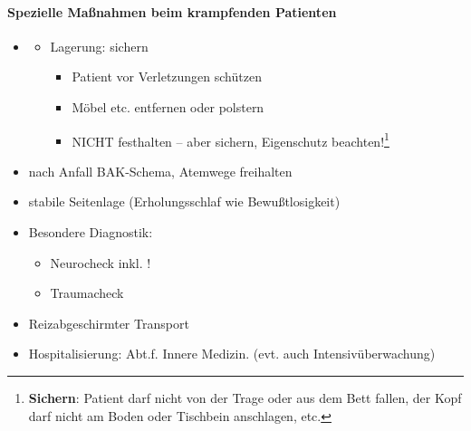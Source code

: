 
\begin{gMassnahmenEnv}
\paragraph{Spezielle Ma{\ss}nahmen beim krampfenden Patienten}
\begin{itemize}
    \item \gTxMassVitBes
    \begin{itemize}
        \item Lagerung: sichern
        \begin{itemize}
            \item Patient vor Verletzungen sch\"utzen
            \item Möbel etc. entfernen oder polstern
            \item NICHT festhalten -- aber sichern, Eigenschutz
            beachten!\footnote{\textbf{Sichern}: Patient darf nicht von der
            Trage oder aus dem Bett fallen, der Kopf darf nicht am Boden oder Tischbein anschlagen, etc.}
        \end{itemize}
    \end{itemize}
    \item nach Anfall BAK-Schema, Atemwege freihalten
    \item stabile Seitenlage  (Erholungsschlaf wie  Bewu{\ss}tlosigkeit)
    \item Besondere Diagnostik:
    \begin{itemize}
        \item Neurocheck inkl. !
        \item Traumacheck
    \end{itemize}
    \item Reizabgeschirmter Transport
    \item Hospitalisierung: Abt.f. Innere Medizin. (evt. auch
    Intensivüberwachung)
\end{itemize}
\end{gMassnahmenEnv}


